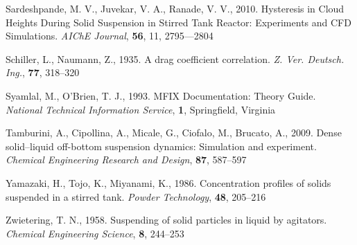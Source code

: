 \begin{thebibliography}{99}
 Sardeshpande, M. V., Juvekar, V. A., Ranade, V. V., 2010. Hysteresis in Cloud Heights During Solid Suspension in Stirred Tank Reactor: Experiments and CFD Simulations. \textit{AIChE Journal}, \textbf{56}, 11, 2795---2804

 Schiller, L., Naumann, Z., 1935. A drag coefficient correlation. \textit{Z. Ver. Deutsch. Ing.}, \textbf{77}, 318--320

 Syamlal, M., O'Brien, T. J., 1993. MFIX Documentation: Theory Guide. \textit{National Technical Information Service}, \textbf{1}, Springfield, Virginia 

 Tamburini, A., Cipollina, A., Micale, G., Ciofalo, M., Brucato, A., 2009. Dense solid–liquid off-bottom suspension dynamics: Simulation and experiment. \textit{Chemical Engineering Research and Design}, \textbf{87}, 587--597

 Yamazaki, H., Tojo, K., Miyanami, K., 1986. Concentration profiles of solids suspended in a stirred tank. \textit{Powder Technology}, \textbf{48}, 205--216

 Zwietering, T. N., 1958. Suspending of solid particles in liquid by agitators. \textit{Chemical Engineering Science}, \textbf{8}, 244--253 

\end{thebibliography}
